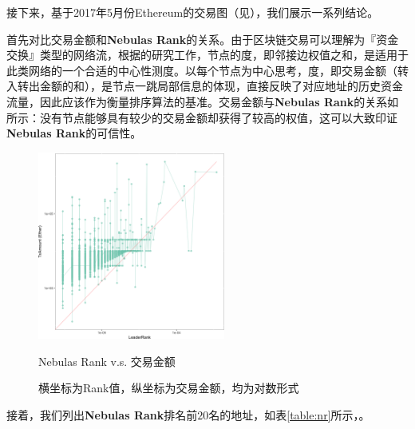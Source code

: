 接下来，基于2017年5月份Ethereum的交易图（见），我们展示一系列结论。

首先对比交易金额和\textbf{Nebulas Rank}的关系。由于区块链交易可以理解为『资金交换』类型的网络流，根据\textcite{Borgatti2005}的研究工作，节点的度，即邻接边权值之和，是适用于此类网络的一个合适的中心性测度。以每个节点为中心思考，度，即交易金额（转入转出金额的和），是节点一跳局部信息的体现，直接反映了对应地址的历史资金流量，因此应该作为衡量排序算法的基准。交易金额与\textbf{Nebulas Rank}的关系如所示：没有节点能够具有较少的交易金额却获得了较高的权值，这可以大致印证\textbf{Nebulas Rank}的可信性。

\begin{figure}[ht]
	\centering
	\includegraphics[width=0.55\textwidth]{figs/nrio.png}
	\caption{Nebulas Rank v.s. 交易金额}\label{fig:nrio}
	\caption*{\footnotesize{横坐标为Rank值，纵坐标为交易金额，均为对数形式}}
\end{figure}

接着，我们列出\textbf{Nebulas Rank}排名前$20$名的地址，如表\ref{table:nr}所示，。

